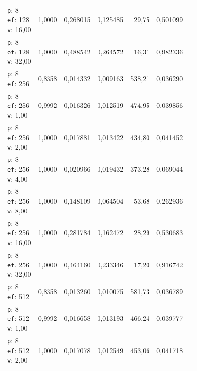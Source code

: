 \begin{table}[htbp]
\begin{tabularx}{\textwidth}{Xrrrrrr}
    \makecell{\texttt{p}: 8\\\texttt{ef}: 128\\\texttt{v}: 16,00} & 1,0000 & 0,268015 & 0,125485 & 29,75 & 0,501099 \\
    \makecell{\texttt{p}: 8\\\texttt{ef}: 128\\\texttt{v}: 32,00} & 1,0000 & 0,488542 & 0,264572 & 16,31 & 0,982336 \\
    \makecell{\texttt{p}: 8\\\texttt{ef}: 256} & 0,8358 & 0,014332 & 0,009163 & 538,21 & 0,036290 \\
    \makecell{\texttt{p}: 8\\\texttt{ef}: 256\\\texttt{v}: 1,00} & 0,9992 & 0,016326 & 0,012519 & 474,95 & 0,039856 \\
    \makecell{\texttt{p}: 8\\\texttt{ef}: 256\\\texttt{v}: 2,00} & 1,0000 & 0,017881 & 0,013422 & 434,80 & 0,041452 \\
    \makecell{\texttt{p}: 8\\\texttt{ef}: 256\\\texttt{v}: 4,00} & 1,0000 & 0,020966 & 0,019432 & 373,28 & 0,069044 \\
    \makecell{\texttt{p}: 8\\\texttt{ef}: 256\\\texttt{v}: 8,00} & 1,0000 & 0,148109 & 0,064504 & 53,68 & 0,262936 \\
    \makecell{\texttt{p}: 8\\\texttt{ef}: 256\\\texttt{v}: 16,00} & 1,0000 & 0,281784 & 0,162472 & 28,29 & 0,530683 \\
    \makecell{\texttt{p}: 8\\\texttt{ef}: 256\\\texttt{v}: 32,00} & 1,0000 & 0,464160 & 0,233346 & 17,20 & 0,916742 \\
    \makecell{\texttt{p}: 8\\\texttt{ef}: 512} & 0,8358 & 0,013260 & 0,010075 & 581,73 & 0,036789 \\
    \makecell{\texttt{p}: 8\\\texttt{ef}: 512\\\texttt{v}: 1,00} & 0,9992 & 0,016658 & 0,013193 & 466,24 & 0,039777 \\
    \makecell{\texttt{p}: 8\\\texttt{ef}: 512\\\texttt{v}: 2,00} & 1,0000 & 0,017078 & 0,012549 & 453,06 & 0,041718 \\

\end{tabularx}
\end{table}
